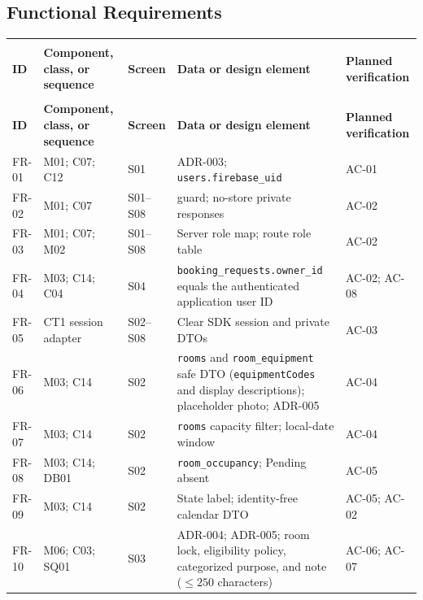 \subsection{Functional Requirements}
\begingroup
\small
{}
\setlength{\tabcolsep}{2pt}
\renewcommand{\arraystretch}{1.1}
\begin{longtable}{|>{\raggedright\arraybackslash}p{}|>{\raggedright\arraybackslash}p{}|>{\raggedright\arraybackslash}p{}|>{\raggedright\arraybackslash}p{}|>{\raggedright\arraybackslash}p{}|}
\hline
\shortstack{\textbf{Req.}\\\textbf{ID}} & \textbf{Component, class, or sequence} & \textbf{Screen} & \textbf{Data or design element} & \textbf{Planned verification} \\
\hline
\endfirsthead
\hline
\shortstack{\textbf{Req.}\\\textbf{ID}} & \textbf{Component, class, or sequence} & \textbf{Screen} & \textbf{Data or design element} & \textbf{Planned verification} \\
\hline
\endhead
\hline
\endfoot
\hline
\endlastfoot
FR-01 & M01; C07; C12 & S01 & ADR-003; \texttt{users.firebase\_uid} & AC-01 \\ \hline
FR-02 & M01; C07 & S01--S08 & 401 guard; no-store private responses & AC-02 \\ \hline
FR-03 & M01; C07; M02 & S01--S08 & Server role map; route role table & AC-02 \\ \hline
FR-04 & M03; C14; C04 & S04 & \texttt{booking\_requests.owner\_id} equals the authenticated application user ID & AC-02; AC-08 \\ \hline
FR-05 & CT1 session adapter & S02--S08 & Clear SDK session and private DTOs & AC-03 \\ \hline
FR-06 & M03; C14 & S02 & \texttt{rooms} and \texttt{room\_equipment} safe DTO (\texttt{equipmentCodes} and display descriptions); placeholder photo; ADR-005 & AC-04 \\ \hline
FR-07 & M03; C14 & S02 & \texttt{rooms} capacity filter; local-date window & AC-04 \\ \hline
FR-08 & M03; C14; DB01 & S02 & \texttt{room\_occupancy}; Pending absent & AC-05 \\ \hline
FR-09 & M03; C14 & S02 & State label; identity-free calendar DTO & AC-05; AC-02 \\ \hline
FR-10 & M06; C03; SQ01 & S03 & ADR-004; ADR-005; room lock, eligibility policy, categorized purpose, and note ($\leq 250$ characters) & AC-06; AC-07 \\ \hline

\end{longtable}
